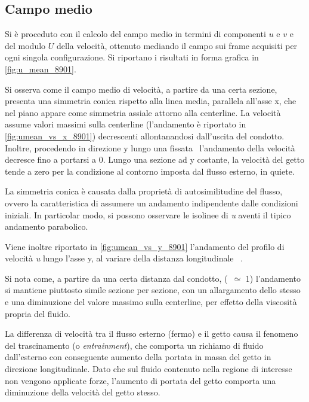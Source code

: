 \documentclass{article} %
\newcommand{\xd}{\nicefrac{\textrm{x}}{\textrm{D}}\ }
\begin{document}
\subsection{Campo medio}
Si è proceduto con il calcolo del campo medio in termini di componenti $u$ e $v$ e del modulo $U$ della velocità, ottenuto mediando il campo sui frame acquisiti per ogni singola configurazione. Si riportano i risultati in forma grafica in \cref{fig:u_mean_8901}.\par
Si osserva come il campo medio di velocità, a partire da una certa sezione, presenta una simmetria conica rispetto alla linea media, parallela all'asse x, che nel piano appare come simmetria assiale attorno alla centerline. La velocità assume valori massimi sulla centerline (l'andamento è riportato in \cref{fig:umean_vs_x_8901}) decrescenti allontanandosi dall'uscita del condotto. Inoltre, procedendo in direzione y lungo una fissata \xd l'andamento della velocità decresce fino a portarsi a 0. Lungo una sezione ad y costante, la velocità del getto tende a zero per la condizione al contorno imposta dal flusso esterno, in quiete.\par
La simmetria conica è causata dalla proprietà di autosimilitudine del flusso, ovvero la caratteristica di assumere un andamento indipendente dalle condizioni iniziali. In particolar modo, si possono osservare le isolinee di \textit{u} aventi il tipico andamento parabolico.\par
Viene inoltre riportato in \cref{fig:umean_vs_y_8901} l'andamento del profilo di velocità \textit{u} lungo l'asse y, al variare della distanza longitudinale \xd.\par
Si nota come, a partire da una certa distanza dal condotto, (\xd $\simeq$ 1) l'andamento si mantiene piuttosto simile sezione per sezione, con un allargamento dello stesso e una diminuzione del valore massimo sulla centerline, per effetto della viscosità propria del fluido.\par
La differenza di velocità tra il flusso esterno (fermo) e il getto causa il fenomeno del trascinamento (o \textit{entrainment}), che comporta un richiamo di fluido dall'esterno con conseguente aumento della portata in massa del getto in direzione longitudinale. Dato che sul fluido contenuto nella regione di interesse non vengono applicate forze, l'aumento di portata del getto comporta una diminuzione della velocità del getto stesso.\par
\end{document}
